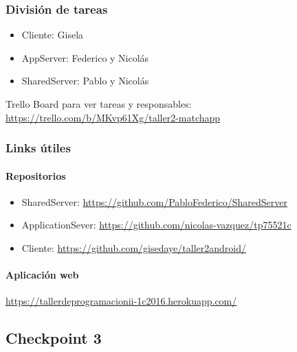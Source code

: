 \documentclass[letterpaper,10pt,english]{sphinxmanual}
\begin{document}
\subsubsection{División de tareas}
\label{manuals:id2}\begin{itemize}
\item {} 
Cliente: Gisela

\item {} 
AppServer: Federico y Nicolás

\item {} 
SharedServer: Pablo y Nicolás

\end{itemize}

Trello Board para ver tareas y responsables:
\href{https://trello.com/b/MKvp61Xg/taller2-matchapp}{https://trello.com/b/MKvp61Xg/taller2-matchapp}


\subsubsection{Links útiles}
\label{manuals:id3}

\paragraph{Repositorios}
\label{manuals:id4}\begin{itemize}
\item {} 
SharedServer: \href{https://github.com/PabloFederico/SharedServer}{https://github.com/PabloFederico/SharedServer}

\item {} 
ApplicationSever: \href{https://github.com/nicolas-vazquez/tp75521c}{https://github.com/nicolas-vazquez/tp75521c}

\item {} 
Cliente: \href{https://github.com/gisedaye/taller2android/}{https://github.com/gisedaye/taller2android/}

\end{itemize}


\paragraph{Aplicación web}
\label{manuals:id5}
\href{https://tallerdeprogramacionii-1c2016.herokuapp.com/}{https://tallerdeprogramacionii-1c2016.herokuapp.com/}


\subsection{Checkpoint 3}
\label{manuals:checkpoint-3}
\end{document}
